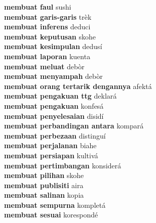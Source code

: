 \textbf{ membuat faul  } sushi \\
\textbf{ membuat garis-garis  } trèk \\
\textbf{ membuat inferens  } deduci \\
\textbf{ membuat keputusan  } skohe \\
\textbf{ membuat kesimpulan  } dedusí \\
\textbf{ membuat laporan  } kuenta \\
\textbf{ membuat meluat  } debòr \\
\textbf{ membuat menyampah  } debòr \\
\textbf{ membuat orang tertarik dengannya  } afektá \\
\textbf{ membuat pengakuan ttg  } deklará \\
\textbf{ membuat pengakuan  } konfesá \\
\textbf{ membuat penyelesaian  } disidí \\
\textbf{ membuat perbandingan antara  } kompará \\
\textbf{ membuat perbezaan  } distinguí \\
\textbf{ membuat perjalanan  } biahe \\
\textbf{ membuat persiapan  } kultivá \\
\textbf{ membuat pertimbangan  } konsiderá \\
\textbf{ membuat pilihan  } skohe \\
\textbf{ membuat publisiti  } aira \\
\textbf{ membuat salinan  } kopia \\
\textbf{ membuat sempurna  } kompletá \\
\textbf{ membuat sesuai  } korespondé \\
